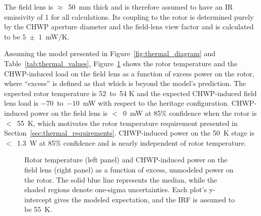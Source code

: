 The field lens is $\approx$~50~mm thick and is therefore assumed to have an IR emissivity of 1 for all calculations. Its coupling to the rotor is determined purely by the CHWP aperture diameter and the field-lens view factor and is calculated to be $5 \; \pm \; 1$~mW/K.

Assuming the model presented in Figure~\ref{fig:thermal_diagram} and Table~\ref{tab:thermal_values},  Figure~\ref{fig:rotor_temp} shows the rotor temperature and the CHWP-induced load on the field lens as a function of excess power on the rotor, where ``excess'' is defined as that which is beyond the model's prediction. The expected rotor temperature is 52~to~54 K and the expected CHWP-induced field lens load is $-70$~to~$-10$~mW with respect to the heritage configuration. CHWP-induced power on the field lens is $<$~0~mW at 85\% confidence when the rotor is $<$~55~K, which motivates the rotor temperature requirement presented in Section~\ref{sec:thermal_requirements}. CHWP-induced power on the 50~K stage is $<$~1.3~W at 85\% confidence and is nearly independent of rotor temperature.

\begin{figure}[!t]
    \centering
    \caption{Rotor temperature (left panel) and CHWP-induced power on the field lens (right panel) as a function of excess, unmodeled power on the rotor. The solid blue line represents the median, while the shaded regions denote one-sigma uncertainties. Each plot's y-intercept gives the modeled expectation, and the IRF is assumed to be 55~K.}
    \label{fig:rotor_temp}
\end{figure}

